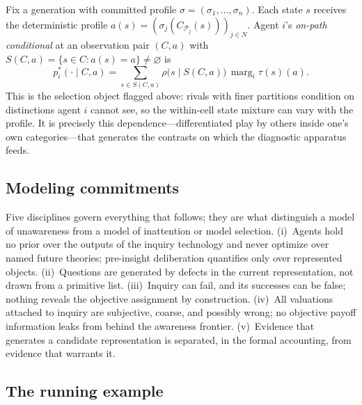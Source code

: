 \documentclass[11pt]{article}
\theoremstyle{definition}
\newcommand{\emptysetset}{\varnothing}
\newcommand{\marg}[1]{\operatorname{marg}_{#1}}
\begin{document}
Fix a generation with committed profile $\sigma=(\sigma_1,\dots,\sigma_n)$.
Each state $s$ receives the deterministic profile
$a(s)=(\sigma_j(C_{\mathcal P_j}(s)))_{j\in N}$.  Agent $i$'s \emph{on-path
conditional} at an observation pair $(C,a)$ with
$S(C,a)=\{s\in C:a(s)=a\}\neq\emptysetset$ is
\begin{equation}
p_i^{*}(\cdot\mid C,a)
=
\sum_{s\in S(C,a)}\rho\bigl(s\mid S(C,a)\bigr)\,\marg{i}\tau(s)(a).
\label{eq:onpath-conditional}
\end{equation}
This is the selection object flagged above: rivals with finer partitions
condition on distinctions agent $i$ cannot see, so the within-cell state
mixture can vary with the profile.  It is precisely this
dependence---differentiated play by others inside one's own
categories---that generates the contrasts on which the diagnostic apparatus
feeds.

\subsection{Modeling commitments}
\label{sec:commitments}

Five disciplines govern everything that follows; they are what distinguish a
model of unawareness from a model of inattention or model selection.
(i)~Agents hold no prior over the outputs of the inquiry technology and never
optimize over named future theories; pre-insight deliberation quantifies only
over represented objects.  (ii)~Questions are generated by defects in the
current representation, not drawn from a primitive list.  (iii)~Inquiry can
fail, and its successes can be false; nothing reveals the objective
assignment by construction.  (iv)~All valuations attached to inquiry are
subjective, coarse, and possibly wrong; no objective payoff information
leaks from behind the awareness frontier.  (v)~Evidence that generates a
candidate representation is separated, in the formal accounting, from
evidence that warrants it.

\subsection{The running example}
\end{document}
